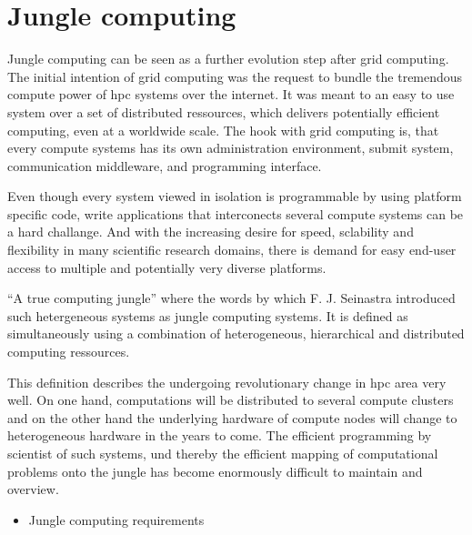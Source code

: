 \section{Jungle computing}
\label{sec:jungle}
Jungle computing can be seen as a further evolution step after
grid computing. The initial intention of grid computing was
the request to bundle the tremendous compute power of hpc
systems over the internet\cite{ref:grid}. It was meant to an
easy to use system over a set of distributed ressources, which
delivers potentially efficient computing, even at a worldwide scale.
The hook with grid computing is, that every compute systems has its
own administration environment, submit system, communication middleware,
and programming interface. 

Even though every system viewed in isolation is programmable by using
platform specific code, write applications that interconects several
compute systems can be a hard challange. And with the increasing
desire for speed, sclability and flexibility in many scientific research
domains, there is demand for easy end-user access to multiple and potentially
very diverse platforms.

``A true computing jungle'' where the words by which F. J. Seinastra
introduced such hetergeneous systems as jungle computing
systems\cite{ref:jungle}. It is defined as simultaneously using a
combination of heterogeneous, hierarchical and distributed computing
ressources.

This definition describes the undergoing revolutionary change in 
hpc area very well. On one hand, computations will be distributed
to several compute clusters and on the other hand the underlying
hardware of compute nodes will change to heterogeneous hardware in
the years to come. The efficient programming by scientist of such systems, 
und thereby the efficient mapping of computational problems onto
the jungle has become enormously difficult to maintain and overview.


\begin{itemize}
  \item Jungle computing requirements
\end{itemize}


